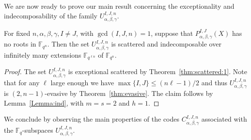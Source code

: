 We are now ready to prove our main result concerning the exceptionality and indecomposability of the family $U_{\alpha, \beta, \gamma}^{I,J,n}$.

\begin{theorem}\label{thm:exceptional_scattered}
For fixed $n, \alpha, \beta, \gamma, I\neq J$, with $\gcd(I,J,n)=1$, suppose that $P_{\alpha,\beta,\gamma}^{I,J}(X)$ has no roots in $\mathbb{F}_{q^n}$. Then the set $U_{\alpha, \beta, \gamma}^{I,J,n}$ is scattered and indecomposable over infinitely many extensions $\mathbb{F}_{q^{\ell n}}$ of $\mathbb{F}_{q^n}$.
\end{theorem}
\begin{proof}
The set $U_{\alpha, \beta, \gamma}^{I,J,n}$ is exceptional scattered by Theorem~\ref{thm:scattered:1}. Note that for any $\ell$ large enough we have $\max\{I,J\} \leq (n\ell-1)/2$ and thus $U_{\alpha, \beta, \gamma}^{I,J,n}$ is $(2,n-1)$-evasive by Theorem~\ref{thm:evasive}. The claim follows by Lemma~\ref{Lemma:ind}, with $m=s=2$ and $h=1$.
\end{proof}


We conclude by observing the main properties of the codes $C_{\alpha, \beta, \gamma}^{I,J,n}$ associated with the $\mathbb{F}_q$-subspaces $U_{\alpha, \beta, \gamma}^{I,J,n}$.

